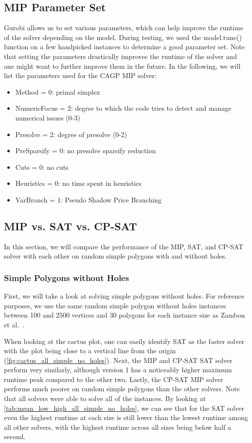 \subsection{MIP Parameter Set}
Gurobi allows us to set various parameters, which can help improve the runtime of the solver depending on the model. During testing, we used the model.tune() function on a few handpicked instances to determine a good parameter set. Note that setting the parameters drastically improves the runtime of the solver and one might want to further improve them in the future. In the following, we will list the parameters used for the CAGP MIP solver:
\begin{itemize}
  \item Method = 0: primal simplex
  \item NumericFocus = 2: degree to which the code tries to detect and manage numerical issues (0-3)
  \item Presolve = 2: degree of presolve (0-2)
  \item PreSparsify = 0: no presolve sparsify reduction
  \item Cuts = 0: no cuts
  \item Heuristics = 0: no time spent in heuristics
  \item VarBranch = 1: Pseudo Shadow Price Branching
\end{itemize}

\subsection{MIP vs. SAT vs. CP-SAT}
In this section, we will compare the performance of the MIP, SAT, and CP-SAT solver with each other on random simple polygons with and without holes.

\subsubsection{Simple Polygons without Holes}
First, we will take a look at solving simple polygons without holes.
For reference purposes, we use the same random simple polygon without holes instances between 100 and 2500 vertices and 30 polygons for each instance size as Zambon et al.~\cite{art-gallery-instances-page}.

When looking at the cactus plot, one can easily identify SAT as the faster solver with the plot being close to a vertical line from the origin (\cref{fig:cactus_all_simple_no_holes}). Next, the MIP and CP-SAT SAT solver perform very similarly, although version 1 has a noticeably higher maximum runtime peak compared to the other two. Lastly, the CP-SAT MIP solver performs much poorer on random simple polygons than the other solvers. Note that all solvers were able to solve all of the instances. By looking at \cref{tab:mean_low_high_all_simple_no_holes}, we can see that for the SAT solver even the highest runtime at each size is still lower than the lowest runtime among all other solvers, with the highest runtime across all sizes being below half a second.

